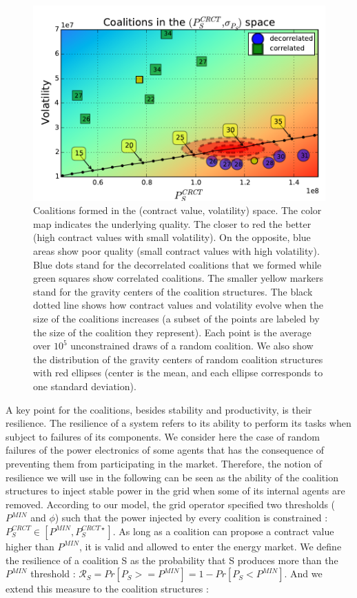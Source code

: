 \documentclass[journal]{IEEEtran}
\begin{document}
\begin{figure}
\includegraphics[scale=.48]{./figs/figure_5}
\caption{{\footnotesize Coalitions formed in the (contract value, volatility) space. The color map indicates the underlying quality. The closer to red the better (high contract values with small volatility). On the opposite, blue areas show poor quality (small contract values with high volatility). Blue dots stand for the decorrelated coalitions that we formed while green squares show correlated coalitions. The smaller yellow markers stand for the gravity centers of the coalition structures. The black dotted line shows how contract values and volatility evolve  when the size of the coalitions increases (a subset of the points are labeled by the size of the coalition they represent). Each point is the average over $ 10^{5} $ unconstrained draws of a random coalition. We also show the distribution of the gravity centers of random coalition structures with red ellipses (center is the mean, and each ellipse corresponds to one  standard deviation).}}
\label{fig:coalitions}
\end{figure}

A key point for the coalitions, besides stability and productivity, is their resilience. The resilience of a system refers to its ability to perform its tasks when subject to failures of its components. We consider here the case of random failures of the power electronics of some agents that has the consequence of preventing them from participating in the market. Therefore, the notion of resilience we will use in the following can be seen as the ability of the coalition structures to inject stable power in the grid when some of its internal agents are removed. According to our model, the grid operator specified two thresholds ($P^{MIN}$ and $ \phi $) such that the power injected by every coalition is constrained : $ P_{S}^{CRCT} \in [P^{MIN}, P_{S}^{CRCT \star}] $. As long as a coalition can propose a contract value higher than $ P^{MIN} $, it is valid and allowed to enter the energy market. We define the resilience of a coalition S as the probability that S produces more than the $ P^{MIN} $ threshold : $ \mathcal{R}_{S} = Pr[P_{S} >= P^{MIN}] = 1 - Pr[P_{S} < P^{MIN}] $. And we extend this measure to the coalition structures :
\end{document}

